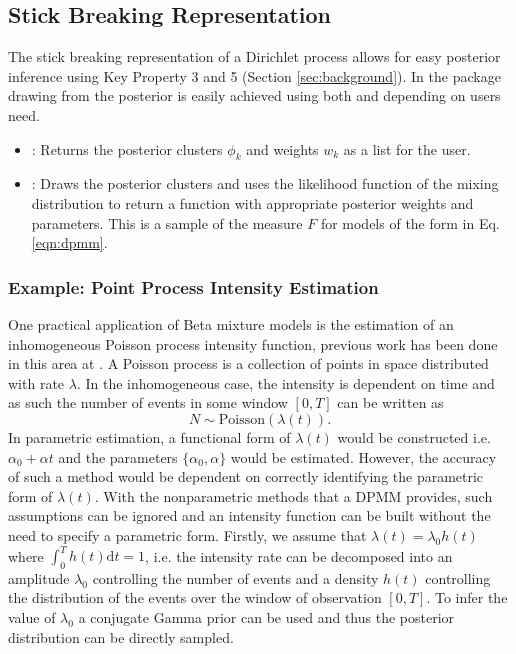 \documentclass[nojss]{jss}
\begin{document}
\subsection{Stick Breaking Representation}
The stick breaking representation of a Dirichlet process allows for easy posterior inference using Key Property 3 and 5 (Section \ref{sec:background}). In the  package drawing from the posterior is easily achieved using both  and  depending on users need.
\begin{itemize}
\item {}: Returns the posterior clusters $\phi _k$ and weights $w_k$ as a list for the user.
\item {}: Draws the posterior clusters and uses the likelihood function of the mixing distribution to return a function with appropriate posterior weights and parameters. This is a sample of the measure $F$ for models of the form in Eq. \eqref{eqn:dpmm}.
\end{itemize}

\subsubsection{Example: Point Process Intensity Estimation}
One practical application of Beta mixture models is the estimation of an inhomogeneous Poisson process intensity function, previous work has been done in this area at \cite{taddy_mixture_2012}. A Poisson process is a collection of points in space distributed with rate $\lambda$. In the inhomogeneous case, the intensity is dependent on time and as such the number of events in some window $\left[0 , T\right]$ can be written as
\begin{equation*}
N \sim \text{Poisson} (\lambda (t) ).
\end{equation*}
In parametric estimation, a functional form of $\lambda (t)$ would be constructed i.e. $\alpha _0 + \alpha t$ and the parameters $\{\alpha _0, \alpha \}$ would be estimated. However, the accuracy of such a method would be dependent on correctly identifying the parametric form of $\lambda (t)$. With the nonparametric methods that a DPMM provides, such assumptions can be ignored and an intensity function can be built without the need to specify a parametric form. Firstly, we assume that $\lambda (t) = \lambda _0 h(t)$ where $\int _0 ^T h(t) \mathrm{d} t = 1$, i.e. the intensity rate can be decomposed into an amplitude $\lambda _0$ controlling the number of events and a density $h(t)$ controlling the distribution of the events over the window of observation $\left[0 , T\right]$. To infer the value of $\lambda _0$ a conjugate Gamma prior can be used and thus the posterior distribution can be directly sampled.
\end{document}

